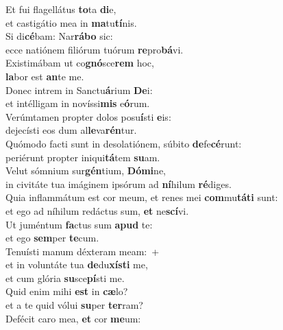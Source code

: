 \evenverse Et fui flagellátus \textbf{to}ta \textbf{di}e,~\*\\
\evenverse et castigátio mea in \textbf{ma}tu\textbf{tí}nis.\\
\oddverse Si di\textbf{cé}bam: Nar\textbf{rá}\textbf{bo} sic:~\*\\
\oddverse ecce natiónem filiórum tuórum \textbf{re}pro\textbf{bá}vi.\\
\evenverse Existimábam ut co\textbf{gnó}sce\textbf{rem} hoc,~\*\\
\evenverse \textbf{la}bor est \textbf{an}te me.\\
\oddverse Donec intrem in Sanctu\textbf{á}rium \textbf{De}i:~\*\\
\oddverse et intélligam in novíssi\textbf{mis} e\textbf{ó}rum.\\
\evenverse Verúmtamen propter dolos posu\textbf{í}sti \textbf{e}is:~\*\\
\evenverse dejecísti eos dum al\textbf{le}va\textbf{rén}tur.\\
\oddverse Quómodo facti sunt in desolatiónem, súbito \textbf{de}fe\textbf{cé}runt:~\*\\
\oddverse periérunt propter iniqui\textbf{tá}tem \textbf{su}am.\\
\evenverse Velut sómnium sur\textbf{gén}tium, \textbf{Dó}\textbf{mi}ne,~\*\\
\evenverse in civitáte tua imáginem ipsórum ad \textbf{ní}hilum \textbf{ré}diges.\\
\oddverse Quia inflammátum est cor meum, et renes mei \textbf{com}mu\textbf{tá}\textbf{ti} sunt:~\*\\
\oddverse et ego ad níhilum redáctus sum, \textbf{et} ne\textbf{scí}vi.\\
\evenverse Ut juméntum \textbf{fa}ctus sum \textbf{a}\textbf{pud} te:~\*\\
\evenverse et ego \textbf{sem}per \textbf{te}cum.\\
\oddverse Tenuísti manum déxteram meam:~+\\
\oddverse  et in voluntáte tua \textbf{de}du\textbf{xí}\textbf{sti} me,~\*\\
\oddverse et cum glória \textbf{su}sce\textbf{pí}sti me.\\
\evenverse Quid enim mihi \textbf{est} in \textbf{cæ}lo?~\*\\
\evenverse et a te quid vólui \textbf{su}per \textbf{ter}ram?\\
\oddverse Defécit caro mea, \textbf{et} cor \textbf{me}um:~\*\\
